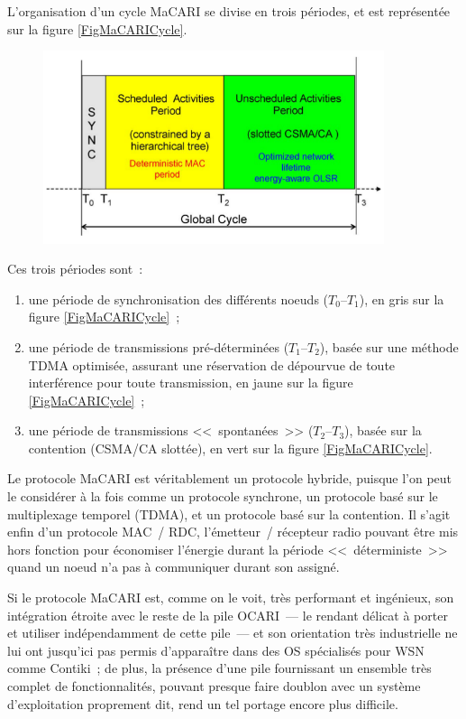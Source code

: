 L'organisation d'un cycle MaCARI se divise en trois périodes, et est
représentée sur la figure \vref{FigMaCARICycle}.

\begin{figure}[!htb]
\centering
\includegraphics[width=10cm]{images/ch3-ocari-macari-cycle.png}
\label{FigMaCARICycle}
\end{figure}

\smallskip

Ces trois périodes sont~:
\begin{enumerate}
\item une période de synchronisation des différents noeuds ($T_0$--$T_1$),
en gris sur la figure \vref{FigMaCARICycle}~;
\item une période de transmissions pré-déterminées ($T_1$--$T_2$), basée
sur une méthode TDMA optimisée, assurant une réservation de 
dépourvue de toute interférence pour toute transmission, en jaune sur
la  figure \vref{FigMaCARICycle}~;
\item une période de transmissions <<~spontanées~>> ($T_2$--$T_3$), basée
sur la contention (CSMA/CA slottée), en vert sur la figure
\vref{FigMaCARICycle}.
\end{enumerate}

Le protocole MaCARI est véritablement un protocole hybride, puisque l'on
peut le considérer à la fois comme un protocole synchrone, un protocole basé
sur le multiplexage temporel (TDMA), et un protocole basé sur la contention.
Il s'agit enfin d'un protocole MAC~/ RDC, l'émetteur~/ récepteur radio
pouvant être mis hors fonction pour économiser l'énergie durant la période
<<~déterministe~>> quand un noeud n'a pas à communiquer durant son
 assigné.

Si le protocole MaCARI est, comme on le voit, très performant et ingénieux,
son intégration étroite avec le reste de la pile OCARI~--- le rendant
délicat à porter et utiliser indépendamment de cette pile~--- et son
orientation très industrielle ne lui ont jusqu'ici pas permis d'apparaître
dans des OS spécialisés pour WSN comme Contiki~; de plus, la présence d'une
pile fournissant un ensemble très complet de fonctionnalités, pouvant
presque faire doublon avec un système d'exploitation proprement dit,
rend un tel portage encore plus difficile.

